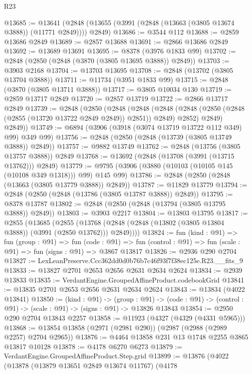 \begin{lexlean}{R23}
\begin{coremodule}
@13685 := @13641 (@2848 (@13655 (@3991 (@2848 (@13663 (@3805 @13674 @3888)) (@11771 @2849)))) @2849)
@13686 := @3544 @112
@13688 := @2859 @13686 @2849
@13689 := @2857 @13688
@13691 := @2866 @13686 @2849
@13692 := @13689 @13691
@13695 := @8378 (@3976 @1833 @99)
@13702 := @2848 (@2850 (@2848 (@3870 (@3805 @13695 @3888)) @2849))
@13703 := @3903 @2168
@13704 := @13703 @13695
@13708 := @2848 (@13702 (@3805 @13704 @3888))
@13711 := @11734 (@3951 @1833 @99)
@13715 := @2848 (@3870 (@3805 @13711 @3888))
@13717 := @3805 @10034 @130
@13719 := @2859 @13717 @2849
@13720 := @2857 @13719
@13722 := @2866 @13717 @2849
@13739 := @2848
    (@2850
      (@2848
        (@2848
          (@2848 (@2848 (@2850 (@2848 (@2855 (@13720 @13722 @2849 @2849)) @2851)) @2849) @2852)
          @2849)
        @2849))
@13749 := @6894 (@3906 (@3918 (@3074 @13719 @13722 @112 @349) @99) @349 @99)
@13756 := @2848 (@2850 (@2848 (@13739 (@3805 @13749 @3888)) @2849))
@13757 := @9882 @13749
@13762 := @2848 (@13756 (@3805 @13757 @3888)) @2849
@13768 := @13692 (@2848 (@13708 (@3991 (@13715 @13762))) @2849)
@13779 := @9795 (@3906 (@3880 (@10103 (@10105 @145 (@10108 @349 @1318))) @99) @145 @99)
@13786 := @2848 (@2850 (@2848 (@13663 (@3805 @13779 @3888)) @2849))
@13787 := @11829 @13779
@13794 := @2848 (@2850 (@2848 (@13786 (@3805 @13787 @3888)) @2849))
@13795 := @8378 @13787
@13802 := @2848 (@2850 (@2848 (@13794 (@3805 @13795 @3888)) @2849))
@13803 := @3903 @2217
@13804 := @13803 @13795
@13817 := @2855
    (@13685
      (@2855 (@13768 (@2848 (@2848 (@13802 (@3805 @13804 @3888)) (@3991 (@2850 @13762))) @2849))))
@13824 := fun (kind : @91) =>
  fun (group : @91) =>
  fun (code : @91) => fun (control : @91) => fun (scale : @91) => fun (signs : @91) => @3867 @13817
@13826 := @2936 @290 @2704
@13827 := LexLeanPreserve.Ccc362dd0d0b76b7c46f93f7f38ec125e.R23.__fits_9
@13833 := @13827 @2701 @2653 @2656 @2631 @2634 @2624
@13834 := @2939 @13833
@13835 := VerdantEngine.GroupedAffineProduct.codebookGrid
@13841 := @13835 @2701 @2653 @2656 @2631 @2634 @2624
@13843 := @13834 (@4022 @13841)
@13850 := (kind : @91) ->
  (group : @91) ->
  (code : @91) -> (control : @91) -> (scale : @91) -> (signs : @91) -> @13826 @13843
@13854 := @2950 @290 @2704 @13843 @2257
@13858 := @11923 (@4327 (@4329 (@4331 @5965)))
@13868 := @13854 @13858 (@2971 (@2981 @290)) (@2987 (@2988 (@2989 @2257) @2704 @2965))
@13876 := @4464 @13858 @231 @13 @1748 @2255 @3865 @13817 @10128
@13878 := @4178 @6270 @6273
@13879 := VerdantEngine.GroupedAffineProduct.Step.grid
@13899 := @13876
    (@4022
      (@13878
        (@13879 @13651 @2849 @13674 @11767)
        (@4178

\end{coremodule}
\end{lexlean}
